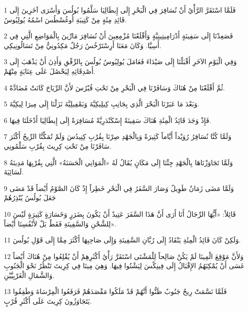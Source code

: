 \par 1 فَلَمَّا اسْتَقَرَّ الرَّأْيُ أَنْ نُسَافِرَ فِي الْبَحْرِ إِلَى إِيطَالِيَا سَلَّمُوا بُولُسَ وَأَسْرَى آخَرِينَ إِلَى قَائِدِ مِئَةٍ مِنْ كَتِيبَةِ أُوغُسْطُسَ اسْمُهُ يُولِيُوسُ.
\par 2 فَصَعِدْنَا إِلَى سَفِينَةٍ أَدْرَامِيتِينِيَّةٍ وَأَقْلَعْنَا مُزْمِعِينَ أَنْ نُسَافِرَ مَارِّينَ بِالْمَوَاضِعِ الَّتِي فِي أَسِيَّا. وَكَانَ مَعَنَا أَرِسْتَرْخُسُ رَجُلٌ مَكِدُونِيٌّ مِنْ تَسَالُونِيكِي.
\par 3 وَفِي الْيَوْمِ الآخَرِ أَقْبَلْنَا إِلَى صَيْدَاءَ فَعَامَلَ يُولِيُوسُ بُولُسَ بِالرِّفْقِ وَأَذِنَ أَنْ يَذْهَبَ إِلَى أَصْدِقَائِهِ لِيَحْصُلَ عَلَى عِنَايَةٍ مِنْهُمْ.
\par 4 ثُمَّ أَقْلَعْنَا مِنْ هُنَاكَ وَسَافَرْنَا فِي الْبَحْرِ مِنْ تَحْتِ قُبْرُسَ لأَنَّ الرِّيَاحَ كَانَتْ مُضَادَّةً.
\par 5 وَبَعْدَ مَا عَبَرْنَا الْبَحْرَ الَّذِي بِجَانِبِ كِيلِيكِيَّةَ وَبَمْفِيلِيَّةَ نَزَلْنَا إِلَى مِيرَا لِيكِيَّةَ.
\par 6 فَإِذْ وَجَدَ قَائِدُ الْمِئَةِ هُنَاكَ سَفِينَةً إِسْكَنْدَرِيَّةً مُسَافِرَةً إِلَى إِيطَالِيَا أَدْخَلَنَا فِيهَا.
\par 7 وَلَمَّا كُنَّا نُسَافِرُ رُوَيْداً أَيَّاماً كَثِيرَةً وَبِالْجَهْدِ صِرْنَا بِقُرْبِ كِنِيدُسَ وَلَمْ تُمَكِّنَّا الرِّيحُ أَكْثَرَ سَافَرْنَا مِنْ تَحْتِ كِرِيتَ بِقُرْبِ سَلْمُونِي.
\par 8 وَلَمَّا تَجَاوَزْنَاهَا بِالْجَهْدِ جِئْنَا إِلَى مَكَانٍ يُقَالُ لَهُ «الْمَوَانِي الْحَسَنَةُ» الَّتِي بِقُرْبِهَا مَدِينَةُ لَسَائِيَةَ.
\par 9 وَلَمَّا مَضَى زَمَانٌ طَوِيلٌ وَصَارَ السَّفَرُ فِي الْبَحْرِ خَطِراً إِذْ كَانَ الصَّوْمُ أَيْضاً قَدْ مَضَى جَعَلَ بُولُسُ يُنْذِرُهُمْ
\par 10 قَائِلاً: «أَيُّهَا الرِّجَالُ أَنَا أَرَى أَنَّ هَذَا السَّفَرَ عَتِيدٌ أَنْ يَكُونَ بِضَرَرٍ وَخَسَارَةٍ كَثِيرَةٍ لَيْسَ لِلشَّحْنِ وَالسَّفِينَةِ فَقَطْ بَلْ لأَنْفُسِنَا أَيْضاً».
\par 11 وَلَكِنْ كَانَ قَائِدُ الْمِئَةِ يَنْقَادُ إِلَى رُبَّانِ السَّفِينَةِ وَإِلَى صَاحِبِهَا أَكْثَرَ مِمَّا إِلَى قَوْلِ بُولُسَ.
\par 12 وَلأَنَّ مَوْقِعَ الْمِينَا لَمْ يَكُنْ صَالِحاً لِلْمَشْتَى اسْتَقَرَّ رَأْيُ أَكْثَرِهِمْ أَنْ يُقْلِعُوا مِنْ هُنَاكَ أَيْضاً عَسَى أَنْ يُمْكِنَهُمُ الإِقْبَالُ إِلَى فِينِكْسَ لِيَشْتُوا فِيهَا. وَهِيَ مِينَا فِي كِرِيتَ تَنْظُرُ نَحْوَ الْجَنُوبِ وَالشَّمَالِ الْغَرْبِيَّيْنِ.
\par 13 فَلَمَّا نَسَّمَتْ رِيحٌ جَنُوبٌ ظَنُّوا أَنَّهُمْ قَدْ مَلَكُوا مَقْصَدَهُمْ فَرَفَعُوا الْمِرْسَاةَ وَطَفِقُوا يَتَجَاوَزُونَ كِرِيتَ عَلَى أَكْثَرِ قُرْبٍ.
